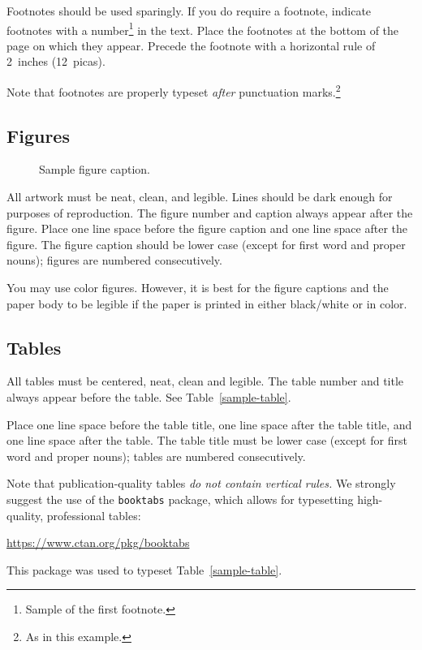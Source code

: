 \documentclass{article}
\begin{document}
	
	Footnotes should be used sparingly.  If you do require a footnote, indicate
	footnotes with a number\footnote{Sample of the first footnote.} in the
	text. Place the footnotes at the bottom of the page on which they appear.
	Precede the footnote with a horizontal rule of 2~inches (12~picas).
	
	
	Note that footnotes are properly typeset \emph{after} punctuation
	marks.\footnote{As in this example.}
	
	
	\subsection{Figures}
	
	
	\begin{figure}
		\centering
		\fbox{\rule[-.5cm]{0cm}{4cm} \rule[-.5cm]{4cm}{0cm}}
		\caption{Sample figure caption.}
	\end{figure}
	
	
	All artwork must be neat, clean, and legible. Lines should be dark enough for
	purposes of reproduction. The figure number and caption always appear after the
	figure. Place one line space before the figure caption and one line space after
	the figure. The figure caption should be lower case (except for first word and
	proper nouns); figures are numbered consecutively.
	
	
	You may use color figures.  However, it is best for the figure captions and the
	paper body to be legible if the paper is printed in either black/white or in
	color.
	
	
	\subsection{Tables}
	
	
	All tables must be centered, neat, clean and legible.  The table number and
	title always appear before the table.  See Table~\ref{sample-table}.
	
	
	Place one line space before the table title, one line space after the
	table title, and one line space after the table. The table title must
	be lower case (except for first word and proper nouns); tables are
	numbered consecutively.
	
	
	Note that publication-quality tables \emph{do not contain vertical rules.} We
	strongly suggest the use of the \verb+booktabs+ package, which allows for
	typesetting high-quality, professional tables:
	\begin{center}
		\url{https://www.ctan.org/pkg/booktabs}
	\end{center}
	This package was used to typeset Table~\ref{sample-table}.
	
\end{document}
